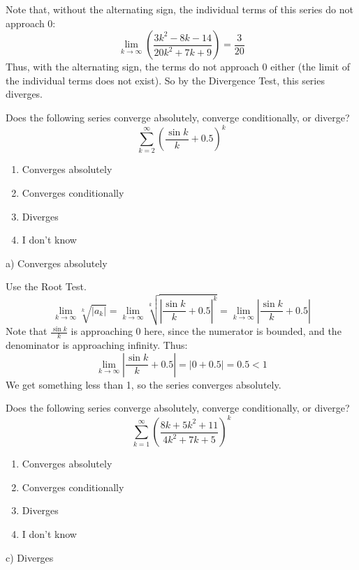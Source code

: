 \documentclass[addpoints,12pt,answers]{exam}
\begin{document}
\begin{questions}
\begin{solution}
    Note that, without the alternating sign, the individual terms of this series do not approach $0$:
    $$\lim_{k\to\infty}\left(\frac{3k^2-8k-14}{20k^2+7k+9}\right)=\frac{3}{20}$$
    Thus, with the alternating sign, the terms do not approach $0$ either (the limit of the individual terms does not exist). So by the Divergence Test, this series diverges.
  \end{solution}  
  \newpage
  \question
  Does the following series converge absolutely, converge conditionally, or diverge?
  $$\sum_{k=2}^\infty\left(\frac{\sin k}{k}+0.5\right)^k$$
  \begin{enumerate}[label=\alph*)]
    \item
    Converges absolutely
    \item
    Converges conditionally
    \item
    Diverges
    \item
    I don't know
  \end{enumerate}
  \begin{solution}
    a) Converges absolutely
    
    Use the Root Test.
    $$\lim_{k\to\infty}\sqrt[k]{|a_k|}=\lim_{k\to\infty}\sqrt[k]{\left|\frac{\sin k}{k}+0.5\right|^k}=\lim_{k\to\infty}\left|\frac{\sin k}{k}+0.5\right|$$
    Note that $\displaystyle\frac{\sin k}{k}$ is approaching 0 here, since the numerator is bounded, and the denominator is approaching infinity. Thus:
    $$\lim_{k\to\infty}\left|\frac{\sin k}{k}+0.5\right|=|0+0.5|=0.5<1$$
    We get something less than 1, so the series converges absolutely.
  \end{solution}
  \newpage
  \question
  Does the following series converge absolutely, converge conditionally, or diverge?
  $$\sum_{k=1}^\infty\left(\frac{8k+5k^2+11}{4k^2+7k+5}\right)^k$$
  \begin{enumerate}[label=\alph*)]
    \item
    Converges absolutely
    \item
    Converges conditionally
    \item
    Diverges
    \item
    I don't know
  \end{enumerate}
  \begin{solution}
    c) Diverges
    

\end{solution}
\end{questions}
\end{document}
